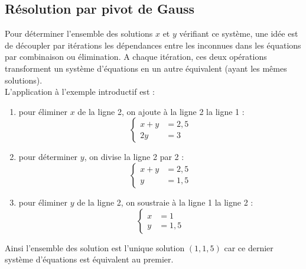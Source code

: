 \documentclass[a4paper]{book}
\begin{document}
\subsection{Résolution par pivot de Gauss}
Pour déterminer l'ensemble des solutions $x$ et $y$ vérifiant ce système, une idée est de découpler par itérations les dépendances entre les inconnues dans les équations par combinaison ou élimination. A chaque itération, ces deux opérations transforment  un système d'équations en un autre équivalent (ayant les mêmes solutions).\\
L'application à l'exemple introductif est :
\begin{enumerate}
\item pour éliminer $x$ de la ligne 2,  on ajoute à la ligne 2 la ligne 1 :
$$\begin{cases}
x+y&=2,5\\
2y&=3
\end{cases}
$$
\item pour déterminer $y$, on divise la ligne 2 par 2 : 
$$\begin{cases}
x+y&=2,5\\
y&=1,5
\end{cases}
$$
\item pour éliminer $y$  de la ligne 2, on soustraie à la ligne 1 la ligne 2 :
$$\begin{cases}
x&=1\\
y&=1,5
\end{cases}
$$
\end{enumerate}
Ainsi l'ensemble des solution est l'unique solution $(1 , 1,5 )$ car ce dernier système d'équations est équivalent au premier.
\end{document}
